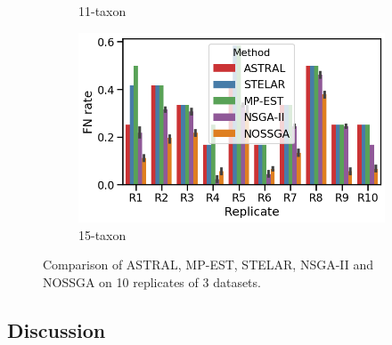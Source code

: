 \begin{figure}[!htbp]
\begin{adjustwidth}{-4.2cm}{}
\begin{subfigure}[b]{0.55\textwidth}
		\caption{11-taxon}
	\end{subfigure}%
	\begin{subfigure}[b]{0.55\textwidth}
		\includegraphics[width=\textwidth]{Figure/15-taxon_10_replicates}
		\caption{15-taxon}
	\end{subfigure}%
	\end{adjustwidth}
	\caption{Comparison of ASTRAL, MP-EST, STELAR, NSGA-II and NOSSGA on 10 replicates of 3 datasets.}
	\label{fig:datasets}

\end{figure}

\subsection{Discussion}